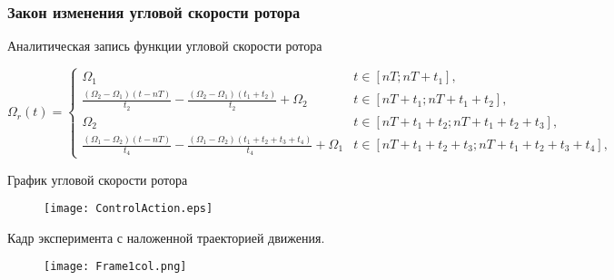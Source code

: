 \begin{frame}
\frametitle{Закон изменения угловой скорости ротора}

Аналитическая запись функции угловой скорости ротора

\scriptsize 
\begin{equation*}
\Omega_r(t) =
\begin{cases}

\Omega_1 & t \in \left[ nT;  nT + t_1 \right] ,\\

\frac{(\Omega_2 - \Omega_1)(t-nT)}{t_2} - \frac{(\Omega_2 - \Omega_1)(t_1+t_2)}{t_2} + \Omega_2 & t \in \left[ nT + t_1;  nT + t_1+t_2 \right], \\

\Omega_2 & t \in \left[ nT + t_1+t_2;  nT + t_1+t_2+t_3 \right] ,\\

\frac{(\Omega_1 - \Omega_2)(t-nT)}{t_4} - \frac{(\Omega_1 - \Omega_2)(t_1+t_2+t_3+t_4)}{t_4} + \Omega_1 &t \in \left[ nT + t_1 + t_2+t_3;  nT + t_1+t_2+t_3+t_4 \right] ,

\end{cases}
\label{omegaRotorGeneral}
\end{equation*}

\small 

\begin{minipage}[t]{0.47\linewidth}
График угловой скорости ротора

	\begin{figure}[!ht]
		\centering
		\texttt{[image: ControlAction.eps]}
	\end{figure}
	
\end{minipage}	
\hfill
\begin{minipage}[t]{0.47\linewidth}
Кадр эксперимента с наложенной траекторией движения.

\begin{figure}[!h]
	\centering
	\texttt{[image: Frame1col.png]}
\end{figure}

\end{minipage}	


\vspace{5mm}



\end{frame}

